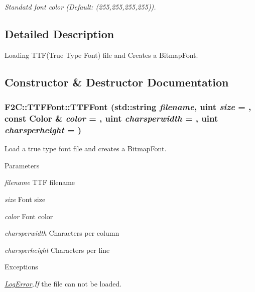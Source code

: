 \begin{DoxyCompactItemize}
\begin{DoxyCompactList}\small\item\em Standatd font color (Default: (255,255,255,255)). \item\end{DoxyCompactList}\end{DoxyCompactItemize}


\subsection{Detailed Description}
Loading TTF(True Type Font) file and Creates a BitmapFont. 

\subsection{Constructor \& Destructor Documentation}
\hypertarget{class_f2_c_1_1_t_t_f_font_a55de5d906e4a2a79acd2d930f2dd5d80}{
\subsubsection[{TTFFont}]{\setlength{\rightskip}{0pt plus 5cm}F2C::TTFFont::TTFFont (std::string {\em filename}, \/  {\bf uint} {\em size} = {}, \/  const {\bf Color} \& {\em color} = {}, \/  {\bf uint} {\em charsperwidth} = {}, \/  {\bf uint} {\em charsperheight} = {})}}
\label{class_f2_c_1_1_t_t_f_font_a55de5d906e4a2a79acd2d930f2dd5d80}


Load a true type font file and creates a BitmapFont. 
\begin{DoxyParams}{Parameters}
\item[{\em filename}]TTF filename \item[{\em size}]Font size \item[{\em color}]Font color \item[{\em charsperwidth}]Characters per column \item[{\em charsperheight}]Characters per line \end{DoxyParams}

\begin{DoxyExceptions}{Exceptions}
\item[{\em \hyperlink{class_f2_c_1_1_log_error}{LogError},If}]the file can not be loaded. \end{DoxyExceptions}


